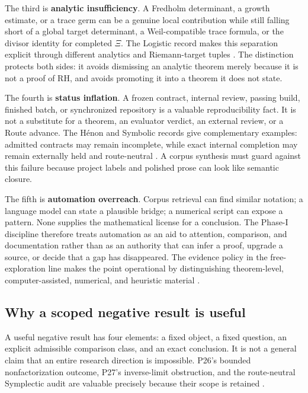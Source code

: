 The third is \textbf{analytic insufficiency}. A Fredholm determinant, a growth estimate, or a trace germ can be a genuine local contribution while still falling short of a global target determinant, a Weil-compatible trace formula, or the divisor identity for completed \(\Xi\). The Logistic record makes this separation explicit through different analytics and Riemann-target tuples . The distinction protects both sides: it avoids dismissing an analytic theorem merely because it is not a proof of RH, and avoids promoting it into a theorem it does not state.

The fourth is \textbf{status inflation}. A frozen contract, internal review, passing build, finished batch, or synchronized repository is a valuable reproducibility fact. It is not a substitute for a theorem, an evaluator verdict, an external review, or a Route advance. The Hénon and Symbolic records give complementary examples: admitted contracts may remain incomplete, while exact internal completion may remain externally held and route-neutral  . A corpus synthesis must guard against this failure because project labels and polished prose can look like semantic closure.

The fifth is \textbf{automation overreach}. Corpus retrieval can find similar notation; a language model can state a plausible bridge; a numerical script can expose a pattern. None supplies the mathematical license for a conclusion. The Phase-I discipline therefore treats automation as an aid to attention, comparison, and documentation rather than as an authority that can infer a proof, upgrade a source, or decide that a gap has disappeared. The evidence policy in the free-exploration line makes the point operational by distinguishing theorem-level, computer-assisted, numerical, and heuristic material .

\hypertarget{why-a-scoped-negative-result-is-useful}{%
\subsection{Why a scoped negative result is useful}\label{why-a-scoped-negative-result-is-useful}}

A useful negative result has four elements: a fixed object, a fixed question, an explicit admissible comparison class, and an exact conclusion. It is not a general claim that an entire research direction is impossible. P26's bounded nonfactorization outcome, P27's inverse-limit obstruction, and the route-neutral Symplectic audit are valuable precisely because their scope is retained  .

